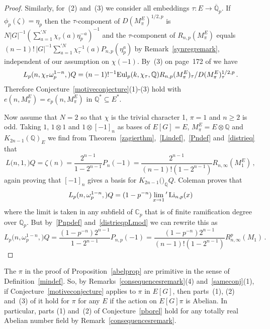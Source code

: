 \documentclass{amsart}
\begin{document}
\begin{proof}
Similarly, for~(2) and~(3) we consider all embeddings $ {\tau} : E \to  {{\overline {\mathbb Q}_p}}  $.  If $ \phi_p({\zeta})=\eta_p $ then the $ {\tau} $-component
of $ D(M_\pi^E)^{1/2,p} $ is $ N |G|^{-1} ( \sum_{a=1}^{\prime N} \chi_{\tau}(a) \eta_p^{-a} )^{-1} $ and the $ {\tau} $-component
of $ R_{n,p}(M_\pi^E) $ equals $ (n-1)! \, |G|^{-1} \sum_{a=1}^{\prime N} \chi_{\tau}^{-1}(a) {P_{n,p}}(\eta_p^a) $
by Remark~\ref{synregremark}, independent of our assumption on $ \chi(-1) $.   By~(3) on page~172 of
\cite{Col82} we have
\[
{L_{p}(n,{\chi_{\tau}\omega_p^{1-n}},{\mathbb)}Q} =  (n-1)!^{-1} {\textup{Eul}}_p(k,\chi_{\tau},{\mathbb Q}) R_{n,p}(M_\pi^E)_{\tau} / D(M_\pi^E)_{\tau}^{1/2,p}
\,.
\]
Therefore Conjecture~\ref{motiveconjecture}(1)-(3) hold with $ e(n,M_\pi^E) = e_p(n,M_\pi^E) $
in $ {\mathbb Q}^* \subseteq E^* $.

Now assume that $ N=2 $ so that $ \chi $ is the trivial character 1, $ \pi = 1 $ and $ n \ge2 $ is odd.
Taking $ 1 $, $ 1{\otimes} 1 $ and $ 1 {\otimes} [-1]_n $ as bases of $ E[G] = E $, $ M_\pi^E = E {\otimes} {\mathbb Q} $ and
$ K_{2n-1}({\mathbb Q})_E $ we find from Theorem~\ref{zagierthm},~\eqref{Lindef},~\eqref{Pndef} and~\eqref{distrieq}
that
\begin{equation*}
{L(n,1,{\mathbb)}Q} = {\zeta}(n) = \frac{2^{n-1}}{1-2^{n-1}} P_n(-1) = \frac{2^{n-1}}{(n-1)!(1-2^{n-1})} R_{n,\infty}(M_1^E)
\,,
\end{equation*}
again proving that $ [-1]_n $ gives a basis for $ {K_{2n-1}({\mathbb)_{\mathbb Q}}Q} $.
Coleman proves that
\[
{L_{p}(n,\omega_p^{1-n},{\mathbb)}Q} = (1-p^{-n}) \lim_{x \to 1}{}'\, {\textup{Li}}_{n,p}(x)
\]
where the limit is taken in any subfield of $ {{\mathbb C_p}} $  that is of finite ramification degree over $ {{\mathbb Q_p}} $.
But by~\eqref{Pnpdef} and~\eqref{distrieqpLmod} we can rewrite this as
\begin{equation*}
{L_{p}(n,\omega_p^{1-n},{\mathbb)}Q}
= \frac{ (1-p^{-n}) 2^{n-1}}{1-2^{n-1}} {P_{n,p}}(-1)
= \frac{(1-p^{-n}) 2^{n-1}}{(n-1)! (1-2^{n-1})} R_{n,\infty}^p(M_1)
\,.
\end{equation*}
\end{proof}

\begin{remark}\label{abelrem}
The $ \pi $ in the proof of Proposition~\ref{abelprop} are primitive in the sense of Definition~\ref{mindef}.
So, by Remarks~\ref{consequencesremark}(4) and~\ref{sameconj}(1),
if Conjecture~\ref{motiveconjecture} applies to $ \pi $ in $ E[G] $, then 
parts~(1), (2) and~(3) of it hold
for $ \pi $ for any $ E $ if the action on $ E[G]\pi $ is Abelian.
In particular, parts (1) and~(2) of Conjecture~\ref{pborel}
hold for any totally real Abelian number field 
by Remark~\ref{consequencesremark}.
\end{remark}
\end{document}
